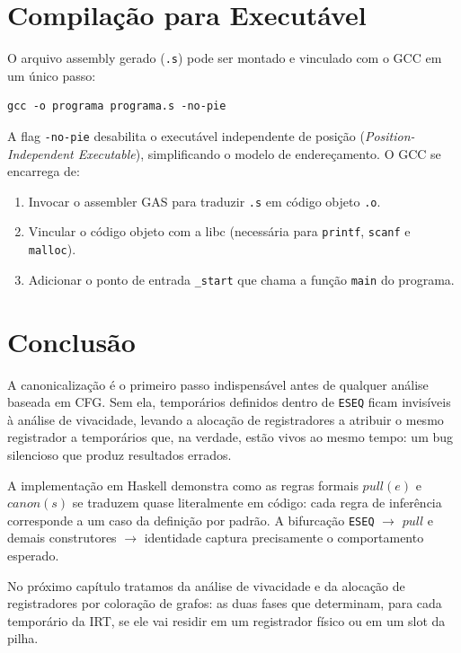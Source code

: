 \section{Compilação para Executável}

O arquivo assembly gerado (\texttt{.s}) pode ser montado e vinculado com
o GCC em um único passo:

\begin{verbatim}
gcc -o programa programa.s -no-pie
\end{verbatim}

A flag \texttt{-no-pie} desabilita o executável independente de posição
(\textit{Position-Independent Executable}), simplificando o modelo de
endereçamento. O GCC se encarrega de:

\begin{enumerate}
  \item Invocar o assembler GAS para traduzir \texttt{.s} em código
    objeto \texttt{.o}.
  \item Vincular o código objeto com a libc (necessária para \texttt{printf},
    \texttt{scanf} e \texttt{malloc}).
  \item Adicionar o ponto de entrada \texttt{\_start} que chama a função
    \texttt{main} do programa.
\end{enumerate}

\section{Conclusão}

A canonicalização é o primeiro passo indispensável antes de qualquer
análise baseada em CFG. Sem ela, temporários definidos dentro de
\texttt{ESEQ} ficam invisíveis à análise de vivacidade, levando a
alocação de registradores a atribuir o mesmo registrador a temporários
que, na verdade, estão vivos ao mesmo tempo: um bug silencioso que
produz resultados errados.

A implementação em Haskell demonstra como as regras formais $\mathit{pull}(e)$
e $\mathit{canon}(s)$ se traduzem quase literalmente em código: cada regra de
inferência corresponde a um caso da definição por padrão. A bifurcação
\texttt{ESEQ} $\to$ $\mathit{pull}$ e demais construtores $\to$ identidade
captura precisamente o comportamento esperado.

No próximo capítulo tratamos da análise de vivacidade e da alocação de
registradores por coloração de grafos: as duas fases que determinam,
para cada temporário da IRT, se ele vai residir em um registrador físico
ou em um slot da pilha.
